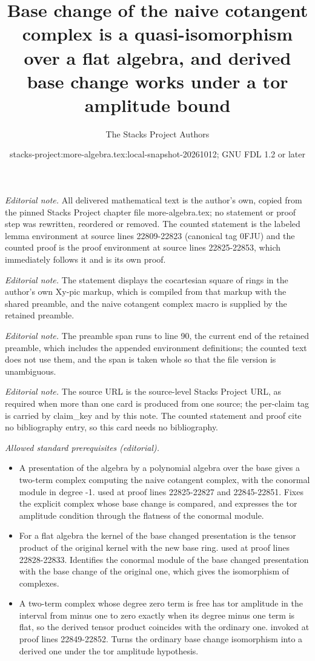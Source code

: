 \documentclass[10pt,a4paper]{amsart}
\title{Base change of the naive cotangent complex is a quasi-isomorphism over a flat algebra, and derived base change works under a tor amplitude bound}
\author{The Stacks Project Authors}
\date{stacks-project:more-algebra.tex:local-snapshot-20261012; GNU FDL 1.2 or later}
\theoremstyle{plain}
\theoremstyle{definition}
\theoremstyle{remark}
\numberwithin{equation}{subsection}
\begin{document}
\maketitle
\setcounter{subsection}{1}
\noindent\textit{Editorial note.} All delivered mathematical text is the author's own, copied from the pinned Stacks Project chapter file more-algebra.tex; no statement or proof step was rewritten, reordered or removed. The counted statement is the labeled lemma environment at source lines 22809-22823 (canonical tag 0FJU) and the counted proof is the proof environment at source lines 22825-22853, which immediately follows it and is its own proof.\par\medskip
\noindent\textit{Editorial note.} The statement displays the cocartesian square of rings in the author's own Xy-pic markup, which is compiled from that markup with the shared preamble, and the naive cotangent complex macro is supplied by the retained preamble.\par\medskip
\noindent\textit{Editorial note.} The preamble span runs to line 90, the current end of the retained preamble, which includes the appended environment definitions; the counted text does not use them, and the span is taken whole so that the file version is unambiguous.\par\medskip
\noindent\textit{Editorial note.} The source URL is the source-level Stacks Project URL, as required when more than one card is produced from one source; the per-claim tag is carried by claim\_key and by this note. The counted statement and proof cite no bibliography entry, so this card needs no bibliography.\par\medskip
\noindent\textit{Allowed standard prerequisites (editorial).}\begin{itemize}
\item A presentation of the algebra by a polynomial algebra over the base gives a two-term complex computing the naive cotangent complex, with the conormal module in degree -1. used at proof lines 22825-22827 and 22845-22851. Fixes the explicit complex whose base change is compared, and expresses the tor amplitude condition through the flatness of the conormal module.
\item For a flat algebra the kernel of the base changed presentation is the tensor product of the original kernel with the new base ring. used at proof lines 22828-22833. Identifies the conormal module of the base changed presentation with the base change of the original one, which gives the isomorphism of complexes.
\item A two-term complex whose degree zero term is free has tor amplitude in the interval from minus one to zero exactly when its degree minus one term is flat, so the derived tensor product coincides with the ordinary one. invoked at proof lines 22849-22852. Turns the ordinary base change isomorphism into a derived one under the tor amplitude hypothesis.
\end{itemize}\medskip
\end{document}
